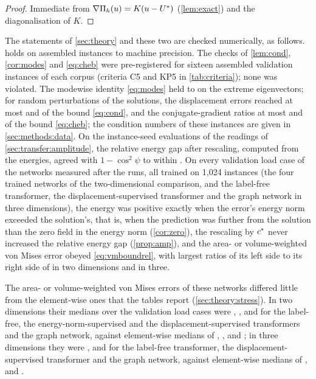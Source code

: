 \begin{proof}
Immediate from $\nabla\Pi_h(u)=K(u-U^{\ast})$ (\cref{lem:exact}) and the diagonalisation of
$K$.
\end{proof}

The statements of \cref{sec:theory} and these two are checked numerically, as follows.
 holds on assembled instances to machine precision. The checks of
\cref{lem:cond}, \cref{cor:modes} and \eqref{eq:cheb} were pre-registered for sixteen
assembled validation instances of each corpus (criteria C5 and KP5 in \cref{tab:criteria});
none was violated. The modewise identity \eqref{eq:modes} held to \numModesPhrase{} on the
extreme eigenvectors; for random perturbations of the solutions, the displacement errors
reached at most \numCondTwo{} and \numCondThree{} of the bound \eqref{eq:cond}, and the
conjugate-gradient ratios at most \numChebTwo{} and \numChebThree{} of the bound
\eqref{eq:cheb}; the condition numbers of these instances are given in
\cref{sec:methods:data}. On the \numAmpRows{} instance-seed evaluations of the readings of
\cref{sec:transfer:amplitude}, the relative energy gap after rescaling, computed from the
energies, agreed with $1-\cos^2\psi$ to within \numAmpIdentity{}. On every validation load
case of the networks measured after the runs, all trained on 1,024 instances (the four
trained networks of the two-dimensional comparison, and the label-free transformer, the
displacement-supervised transformer and the graph network in three dimensions), the energy
was positive exactly when the error's energy norm exceeded the solution's, that is, when the
prediction was further from the solution than the zero field in the energy norm
(\cref{cor:zero}), the rescaling by $c^{\ast}$ never increased the relative energy gap
(\cref{prop:amp}), and the area- or volume-weighted von Mises error obeyed
\eqref{eq:vmboundrel}, with largest ratios of its left side to its right side of
\numSpecBoundMax{} in two dimensions and \numFieldBoundMax{} in three.

The area- or volume-weighted von Mises errors of these networks differed little from the
element-wise ones that the tables report (\cref{sec:theory:stress}). In two dimensions their
medians over the validation load cases were \numSpecVmAreaFree{}, \numSpecVmAreaKnorm{},
\numSpecVmAreaLab{} and \numSpecVmAreaMgn{} for the label-free, the energy-norm-supervised
and the displacement-supervised transformers and the graph network, against element-wise
medians of \numSpecVmElemFree{}, \numSpecVmElemKnorm{}, \numSpecVmElemLab{} and
\numSpecVmElemMgn{}; in three dimensions they were \numFieldVmVolFree{}, \numFieldVmVolLab{}
and \numFieldVmVolMgn{} for the label-free transformer, the displacement-supervised
transformer and the graph network, against element-wise medians of \numFieldVmElemFree{},
\numFieldVmElemLab{} and \numFieldVmElemMgn{}.

